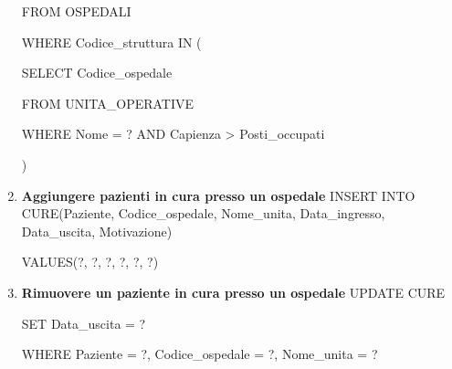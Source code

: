 \documentclass[a4paper,12pt]{report}
\begin{document}
\begin{enumerate}[leftmargin=0cm,itemindent=.5cm,labelwidth=\itemindent,labelsep=0cm,align=left]
    FROM OSPEDALI
    
    WHERE Codice\_struttura IN (
    
        SELECT Codice\_ospedale
        
        FROM UNITA\_OPERATIVE
        
        WHERE Nome = ? AND Capienza > Posti\_occupati
    
    )

    \item \textbf{Aggiungere pazienti in cura presso un ospedale} \newline
    INSERT INTO CURE(Paziente, Codice\_ospedale, Nome\_unita, Data\_ingresso, Data\_uscita, Motivazione)
    
    VALUES(?, ?, ?, ?, ?, ?)

    \item \textbf{Rimuovere un paziente in cura presso un ospedale} \newline
    UPDATE CURE

    SET Data\_uscita = ?

    WHERE Paziente = ?, Codice\_ospedale = ?, Nome\_unita = ?

\end{enumerate}
\end{document}
